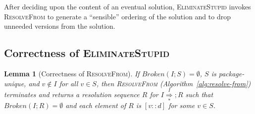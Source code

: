 \documentclass[letterpaper]{article}
\newtheorem{lemma}[theorem]{Lemma}
\theoremstyle{definition}
\theoremstyle{remark}
\newcommand{\nsolmany}[1]{\overset{#1}{\underset{*}{\Rightarrow}}}
\newcommand{\act}[2]{[#1 :: #2]}
\begin{document}
After deciding upon the content of an eventual solution,
\textsc{EliminateStupid} invokes \textsc{ResolveFrom} to generate a
``sensible'' ordering of the solution and to drop unneeded versions
from the solution.

\subsection{Correctness of \textsc{EliminateStupid}}

\begin{lemma}[Correctness of \textsc{ResolveFrom}]
  If $Broken(I;S)=\emptyset$, $S$ is package-unique, and $v \notin I$
  for all $v \in S$, then \textsc{ResolveFrom}
  (Algorithm~\vref{alg:resolve-from}) terminates and returns a
  resolution sequence $R$ for $I \nsolmany I;R$ such that
  $Broken(I;R)=\emptyset$ and each element of $R$ is $\act{v}{d}$ for
  some $v \in S$.
  \label{lem:resolve-from-correct}
\end{lemma}
\end{document}
